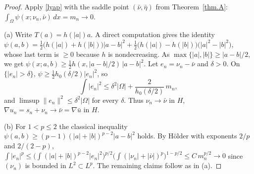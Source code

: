\documentclass[11pt]{amsart}
\theoremstyle{remark}
\theoremstyle{definition}
\newcommand{\dx}{\,dx}
\begin{document}
\begin{proof}
Apply \eqref{lyap} with the saddle point $(\bar\nu,\bar\eta)$ from Theorem~\ref{thm.A}: $\int_\Omega\psi(x;\nu_n,\bar\nu)\dx=m_n\to0$.

(a) Write $T(a)=h(|a|)a$. A direct computation gives the identity
$\psi(a,b)=\tfrac12\big(h(|a|)+h(|b|)\big)|a-b|^2+\tfrac12\big(h(|a|)-h(|b|)\big)\big(|a|^2-|b|^2\big)$, whose last term is $\ge0$ because $h$ is nondecreasing. As $\max\{|a|,|b|\}\ge|a-b|/2$, we get $\psi(x;a,b)\ge\frac12h(x,|a-b|/2)\,|a-b|^2$. Let $e_n=\nu_n-\bar\nu$ and $\delta>0$. On $\{|e_n|>\delta\}$, $\psi\ge\frac12h_0(\delta/2)|e_n|^2$, so
\[
\int|e_n|^2\le\delta^2|\Omega|+\frac{2}{h_0(\delta/2)}\,m_n ,
\]
and $\limsup\|e_n\|^2\le\delta^2|\Omega|$ for every $\delta$. Thus $\nu_n\to\bar\nu$ in $H$, $\nabla u_n=s_n+\nu_n\to\bar\nu=\nabla\bar u$ in $H$.

(b) For $1<p\le2$ the classical inequality $\psi(a,b)\ge(p-1)(|a|+|b|)^{p-2}|a-b|^2$ holds. By H\"older with exponents $2/p$ and $2/(2-p)$,
$\int|e_n|^p\le\big(\int(|a|+|b|)^{p-2}|e_n|^2\big)^{p/2}\big(\int(|\nu_n|+|\bar\nu|)^p\big)^{1-p/2}\le C\,m_n^{p/2}\to0$ since $(\nu_n)$ is bounded in $L^2\subset L^p$. The remaining claims follow as in (a).
\end{proof}
\end{document}
